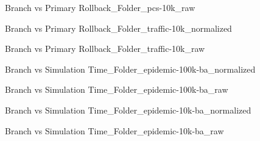 \vspace{1cm}
\begin{figure}[H]
\centering

\caption{Branch vs Primary Rollback\_Folder\_pcs-10k\_raw}
\end{figure}
\vspace{1cm}
\newpage
\begin{figure}[H]
\centering

\caption{Branch vs Primary Rollback\_Folder\_traffic-10k\_normalized}
\end{figure}
\vspace{1cm}
\begin{figure}[H]
\centering

\caption{Branch vs Primary Rollback\_Folder\_traffic-10k\_raw}
\end{figure}
\vspace{1cm}
\newpage
\begin{figure}[H]
\centering

\caption{Branch vs Simulation Time\_Folder\_epidemic-100k-ba\_normalized}
\end{figure}
\vspace{1cm}
\begin{figure}[H]
\centering

\caption{Branch vs Simulation Time\_Folder\_epidemic-100k-ba\_raw}
\end{figure}
\vspace{1cm}
\newpage
\begin{figure}[H]
\centering

\caption{Branch vs Simulation Time\_Folder\_epidemic-10k-ba\_normalized}
\end{figure}
\vspace{1cm}
\begin{figure}[H]
\centering

\caption{Branch vs Simulation Time\_Folder\_epidemic-10k-ba\_raw}
\end{figure}
